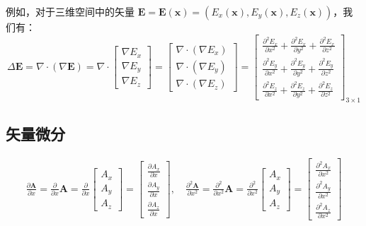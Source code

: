 \documentclass[UTF8]{report}
\theoremstyle{MyLineTheoremStyle} %
\theoremstyle{MyBlockTheoremStyle} %
\theoremstyle{MySubsubsectionStyle} %
\begin{document}
例如，对于三维空间中的矢量 $\boldsymbol{E} = \boldsymbol{E}(\boldsymbol{x}) = \left( E_x(\boldsymbol{x}), E_y(\boldsymbol{x}), E_z(\boldsymbol{x})  \right)$，我们有：
\begin{equation}
    \Delta \boldsymbol{E}  = \nabla \cdot (\nabla \boldsymbol{E} ) 
    =
    \nabla \cdot 
    \begin{bmatrix}
        \nabla E_x \\ \nabla E_y \\ \nabla E_z
    \end{bmatrix} 
    = 
    \begin{bmatrix}
        \nabla \cdot (\nabla E_x) \\ \nabla \cdot (\nabla E_y) \\ \nabla \cdot (\nabla E_z)
    \end{bmatrix} 
    =
    \begin{bmatrix}
        \frac{\partial^2 E_x }{\partial x^2 } +\frac{\partial^2 E_x }{\partial y^2 } + \frac{\partial^2 E_x }{\partial z^2 } \\
        \frac{\partial^2 E_y }{\partial x^2 } +\frac{\partial^2 E_y }{\partial y^2 } + \frac{\partial^2 E_y }{\partial z^2 } \\
        \frac{\partial^2 E_z }{\partial x^2 } +\frac{\partial^2 E_z }{\partial y^2 } + \frac{\partial^2 E_z }{\partial z^2 }
    \end{bmatrix}_{3\times 1}
\end{equation}

\subsection{矢量微分}

\begin{gather}
    \frac{\partial \boldsymbol{A} }{\partial x } = \frac{\partial  }{\partial x }\boldsymbol{A} = 
    \frac{\partial  }{\partial x } 
    \begin{bmatrix}
        A_x \\ A_y \\ A_z
    \end{bmatrix} = 
    \begin{bmatrix}
        \frac{\partial A_x }{\partial x } \\ \frac{\partial A_y }{\partial x } \\ \frac{\partial A_z }{\partial x }
    \end{bmatrix} 
    ,\quad 
    \frac{\partial^2 \boldsymbol{A} }{\partial x^2 } = 
    \frac{\partial^2  }{\partial x^2 } \boldsymbol{A} = 
    \frac{\partial^2  }{\partial x^2 } 
    \begin{bmatrix}
        A_x \\ A_y \\ A_z
    \end{bmatrix} = 
    \begin{bmatrix}
        \frac{\partial^2 A_x }{\partial x^2 } \\ \frac{\partial^2 A_y }{\partial x^2 } \\ \frac{\partial^2 A_z }{\partial x^2 }
    \end{bmatrix}
\end{gather}
\end{document}
